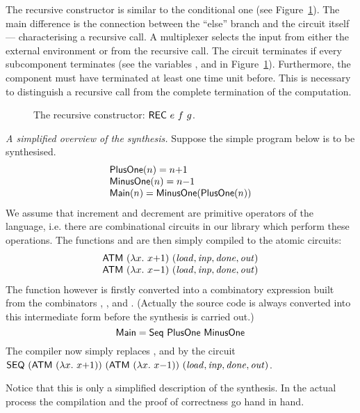 The recursive constructor is similar to the conditional one
(see Figure~\ref{figRec}).
The main difference is the connection between the
``else'' branch and the circuit itself --- characterising a
recursive call. A multiplexer selects the input from either
the external environment or from the recursive call.
The circuit terminates if every subcomponent terminates
(see the variables ,  and 
in Figure~\ref{figRec}). Furthermore, the component 
must have terminated at least one time unit before. This is
necessary to distinguish a recursive call from the
complete termination of the computation.

\begin{figure}[htb]
   \centerline{}
   \caption{\label{figRec}The recursive constructor: $\DEF{REC}\ e\ f\ g$.}
\end{figure}

\begin{example} {\em A simplified overview of the synthesis.\/}
Suppose the simple program below is to be synthesised.
\[ 
\begin{array}{l}
   \mathsf{PlusOne}(n) = n{+}1 \\
   \mathsf{MinusOne}(n) = n{-}1 \\
   \mathsf{Main}(n) = \mathsf{MinusOne}(\mathsf{PlusOne}(n))
\end{array} 
\]
We assume that increment and decrement are
primitive operators of the language, i.e. 
there are combinational circuits in our
library which perform these operations.
The functions  and  
are then simply compiled to the atomic circuits:
\[
\begin{array}{l}
\mathsf{ATM}\ (\lambda x.\ x{+}1)\ (\mathit{load,inp,done,out}) \\
\mathsf{ATM}\ (\lambda x.\ x{-}1)\ (\mathit{load,inp,done,out}) \\
\end{array}
\]
The function  however is firstly
converted into a combinatory expression
built from the combinators , 
,  and .
(Actually the source code is always
converted into this intermediate form
before the synthesis is carried out.)
\[
\mathsf{Main} = \mathsf{Seq}\ \mathsf{PlusOne}\ \mathsf{MinusOne}
\]
The compiler now simply replaces ,
 and  by the circuit
$\DEF{SEQ}\ (\DEF{ATM}\ (\lambda x.\ x{+}1))\ 
            (\DEF{ATM}\ (\lambda x.\ x{-}1))\ (\VAR{load,inp,done,out})$.

Notice that this is only a simplified description
of the synthesis. In the actual process
the compilation and the proof of correctness 
go hand in hand.
\end{example}

